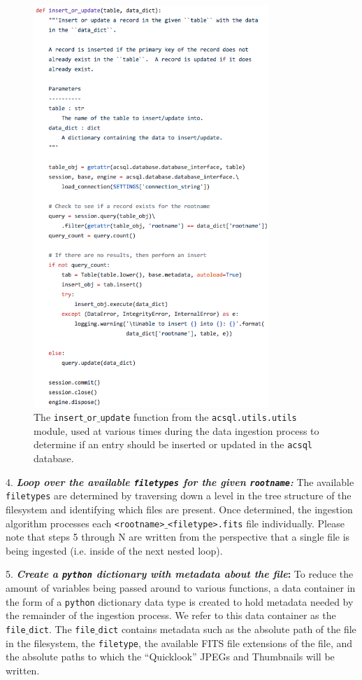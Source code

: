 \documentclass[10pt,journal,compsoc]{IEEEtran}
\begin{document}
\begin{figure}[!t]
\centering
\includegraphics[width=3.5in]{./figures/insert_or_update.png}
\caption{The \texttt{insert$\_$or$\_$update} function from the \texttt{acsql.utils.utils}
module, used at various times during the data ingestion process to determine if an
entry should be inserted or updated in the \texttt{acsql} database.}
\label{fig1}
\end{figure}

4. \textbf{\textit{Loop over the available \texttt{filetypes} for the given \texttt{rootname}:}}
The available \texttt{filetypes} are determined by traversing down a level in the tree
structure of the filesystem and identifying which files are present. Once determined,
the ingestion algorithm processes each \texttt{<rootname>$\_$<filetype>.fits} file
individually.  Please note that steps 5 through N are written from the perspective that
a single file is being ingested (i.e. inside of the next nested loop).

5. \textbf{\textit{Create a \texttt{python} dictionary with metadata about the file}:}  To reduce
the amount of variables being passed around to various functions, a data container
in the form of a \texttt{python} dictionary data type is created to hold metadata needed
by the remainder of the ingestion process.  We refer to this data container as the
\texttt{file$\_$dict}.  The \texttt{file$\_$dict} contains metadata such as the absolute
path of the file in the filesystem, the \texttt{filetype}, the available FITS file
extensions of the file, and the absolute paths to which the ``Quicklook'' JPEGs and
Thumbnails will be written.
\end{document}
